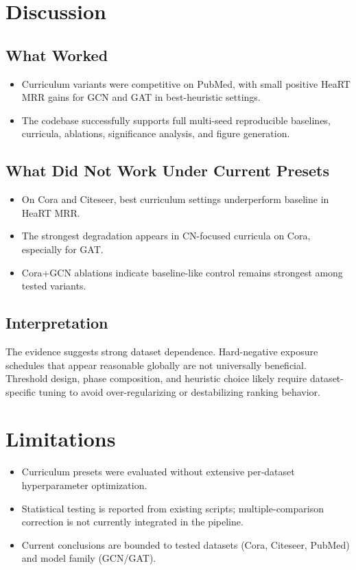 \documentclass[11pt]{article}
\begin{document}
\section{Discussion}

\subsection{What Worked}
\begin{itemize}
\item Curriculum variants were competitive on PubMed, with small positive HeaRT MRR gains for GCN and GAT in best-heuristic settings.
\item The codebase successfully supports full multi-seed reproducible baselines, curricula, ablations, significance analysis, and figure generation.
\end{itemize}

\subsection{What Did Not Work Under Current Presets}
\begin{itemize}
\item On Cora and Citeseer, best curriculum settings underperform baseline in HeaRT MRR.
\item The strongest degradation appears in CN-focused curricula on Cora, especially for GAT.
\item Cora+GCN ablations indicate baseline-like control remains strongest among tested variants.
\end{itemize}

\subsection{Interpretation}
The evidence suggests strong dataset dependence. Hard-negative exposure schedules that appear reasonable globally are not universally beneficial. Threshold design, phase composition, and heuristic choice likely require dataset-specific tuning to avoid over-regularizing or destabilizing ranking behavior.

\section{Limitations}

\begin{itemize}
\item Curriculum presets were evaluated without extensive per-dataset hyperparameter optimization.
\item Statistical testing is reported from existing scripts; multiple-comparison correction is not currently integrated in the pipeline.
\item Current conclusions are bounded to tested datasets (Cora, Citeseer, PubMed) and model family (GCN/GAT).
\end{itemize}
\end{document}
